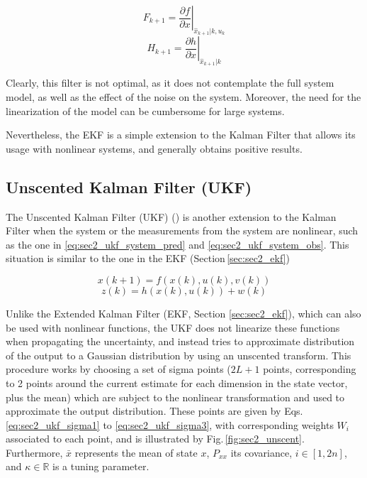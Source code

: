  \begin{equation}
    \label{eq:sec2_ekf_lin_pre}
    F_{k+1}=\left. \frac{\partial f}{\partial x}\right|_{\hat{x}_{k+1}|k, u_k}
\end{equation}
\begin{equation}
    \label{eq:sec2_ekf_lin_meas}
    H_{k+1}=\left. \frac{\partial h}{\partial x}\right|_{\hat{x}_{k+1}|k}
\end{equation}

Clearly, this filter is not optimal, as it does not contemplate the full system model, as well as the effect of the noise on the system. Moreover, the need for the linearization of the model can be cumbersome for large systems. 

Nevertheless, the EKF is a simple extension to the Kalman Filter that allows its usage with nonlinear systems, and generally obtains positive results.

\subsection{Unscented Kalman Filter (UKF)}
\label{sec:sec2_ukf}

The Unscented Kalman Filter (UKF) (\cite{julier1997new}) is another extension to the Kalman Filter when the system or the measurements from the system are nonlinear, such as the one in \eqref{eq:sec2_ukf_system_pred} and \eqref{eq:sec2_ukf_system_obs}. This situation is similar to the one in the EKF (Section\,\ref{sec:sec2_ekf})%

\begin{equation}
    \label{eq:sec2_ukf_system_pred}
    x(k+1) = f(x(k),u(k),v(k))
\end{equation}
\begin{equation}
    \label{eq:sec2_ukf_system_obs}
    z(k)=h(x(k), u(k)) + w(k)
\end{equation}

Unlike the Extended Kalman Filter (EKF, Section \ref{sec:sec2_ekf}), which can also be used with nonlinear functions, the UKF does not linearize these functions when propagating the uncertainty, and instead tries to approximate distribution of the output to a Gaussian distribution by using an unscented transform. This procedure works by choosing a set of sigma points ($2L+1$ points, corresponding to 2 points around the current estimate for each dimension in the state vector, plus the mean) which are subject to the nonlinear transformation and used to approximate the output distribution. These points are given by Eqs.\,\eqref{eq:sec2_ukf_sigma1} to \eqref{eq:sec2_ukf_sigma3}, with corresponding weights $W_i$ associated to each point, and is illustrated by Fig.\,\ref{fig:sec2_unscent}. Furthermore, $\bar{x}$ represents the mean of state $x$, $P_{xx}$ its covariance, $i \in [1,2n]$, and $\kappa \in \mathbb{R}$ is a tuning parameter.


